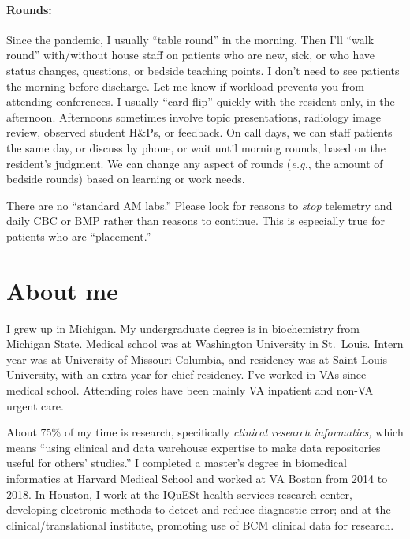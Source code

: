 \documentclass{tufte-handout}
\begin{document}
\paragraph{Rounds:} Since the pandemic, I usually ``table
round'' in the morning. Then I'll ``walk round'' with/without house
staff on patients who are new, sick, or who have status changes,
questions, or bedside teaching points. I don't need to see patients
the morning before discharge. Let me know if workload prevents you
from attending conferences. I usually ``card flip'' quickly with the
resident only, in the afternoon. Afternoons sometimes involve topic
presentations, radiology image review, observed student H\&Ps, or
feedback. On call days, we can staff patients the same day, or discuss
by phone, or wait until morning rounds, based on the resident's
judgment. We can change any aspect of rounds (\emph{e.g.}, the amount
of bedside rounds) based on learning or work needs.

There are no ``standard AM labs.'' Please look for reasons to
\emph{stop} telemetry and daily CBC or BMP rather than reasons to continue. This is
especially true for patients who are ``placement.''




\section{About me}

I grew up in Michigan. My undergraduate degree is in biochemistry from
Michigan State. Medical school was at Washington University in
St.\ Louis. Intern year was at University of Missouri-Columbia, and
residency was at Saint Louis University, with an extra year for chief
residency. I've worked in VAs since medical school. Attending roles
have been mainly VA inpatient and non-VA urgent care.


About 75\% of my time is research, specifically \emph{clinical
research informatics,} which means ``using clinical and data warehouse
expertise to make data repositories useful for others' studies.'' I
completed a master's degree in biomedical informatics at Harvard
Medical School and worked at VA Boston from 2014 to 2018. In Houston,
I work at the IQuESt health services research center, developing
electronic methods to detect and reduce diagnostic error; and at the
clinical/translational institute, promoting use of BCM clinical data
for research.
\end{document}
